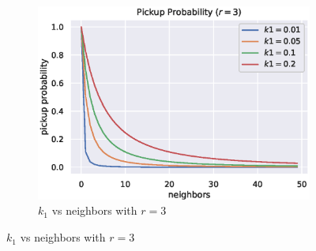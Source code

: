 \documentclass[12pt]{article}
\begin{document}
\begin{figure}[H]
\begin{subfigure}[t]{0.32\textwidth}
        \includegraphics[width=\textwidth]{figures/aca/k1-r3.eps}
        \caption{$k_1$ vs neighbors with $r=3$}
    \end{subfigure}


\end{figure}
\end{document}
